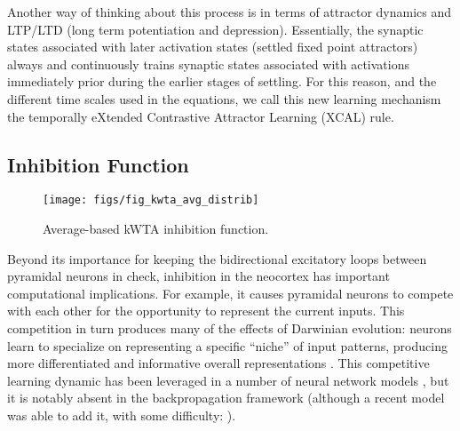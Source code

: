 \documentclass[11pt,twoside]{article}
\begin{document}
Another way of thinking about this process is in terms of attractor dynamics
and LTP/LTD (long term potentiation and depression). Essentially, the synaptic
states associated with later activation states (settled fixed point
attractors) always and continuously trains synaptic states associated with
activations immediately prior during the earlier stages of settling.  For this
reason, and the different time scales used in the equations, we call this new
learning mechanism the temporally eXtended Contrastive Attractor Learning
(XCAL) rule.

\subsection{Inhibition Function}

\begin{figure}
  \centering\texttt{[image: figs/fig\_kwta\_avg\_distrib]}
  \caption{\small Average-based kWTA inhibition function.}
  \label{fig.kwta_avg}
\end{figure}

Beyond its importance for keeping the bidirectional excitatory loops between
pyramidal neurons in check, inhibition in the neocortex has important
computational implications.  For example, it causes pyramidal neurons to
compete with each other for the opportunity to represent the current inputs.
This competition in turn produces many of the effects of Darwinian evolution:
neurons learn to specialize on representing a specific ``niche'' of input
patterns, producing more differentiated and informative overall
representations \cite{Edelman87}.  This competitive learning dynamic has been
leveraged in a number of neural network models
\cite{JacobsJordanNowlanEtAl91,Kohonen77,Kohonen84,Nowlan90,RumelhartZipser86},
but it is notably absent in the backpropagation framework (although a recent
model was able to add it, with some difficulty: ).
\end{document}
